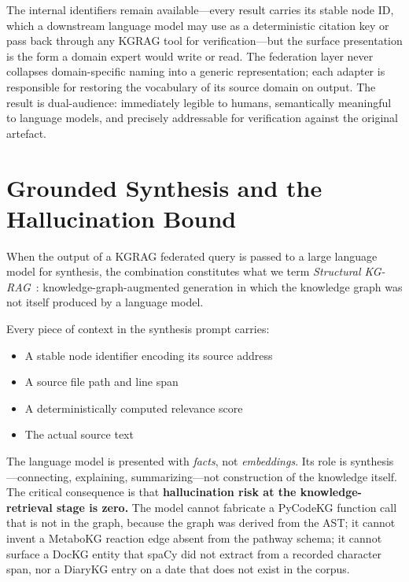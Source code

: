 \documentclass[10pt]{article}
\begin{document}
The internal identifiers remain available---every result carries its stable
node ID, which a downstream language model may use as a deterministic
citation key or pass back through any KGRAG tool for verification---but the
surface presentation is the form a domain expert would write or read. The
federation layer never collapses domain-specific naming into a generic
representation; each adapter is responsible for restoring the vocabulary of
its source domain on output. The result is dual-audience: immediately legible
to humans, semantically meaningful to language models, and precisely
addressable for verification against the original artefact.

\section{Grounded Synthesis and the Hallucination Bound}

When the output of a KGRAG federated query is passed to a large language model
for synthesis, the combination constitutes what we term \emph{Structural
KG-RAG}~\cite{suchanek2025codekg}: knowledge-graph-augmented generation in which
the knowledge graph was not itself produced by a language model.

Every piece of context in the synthesis prompt carries:
\begin{itemize}
  \item A stable node identifier encoding its source address
  \item A source file path and line span
  \item A deterministically computed relevance score
  \item The actual source text
\end{itemize}

The language model is presented with \emph{facts}, not \emph{embeddings}. Its
role is synthesis---connecting, explaining, summarizing---not construction of
the knowledge itself. The critical consequence is that \textbf{hallucination
risk at the knowledge-retrieval stage is zero.} The model cannot fabricate a
PyCodeKG function call that is not in the graph, because the graph was derived
from the AST; it cannot invent a MetaboKG reaction edge absent from the
pathway schema; it cannot surface a DocKG entity that spaCy did not extract
from a recorded character span, nor a DiaryKG entry on a date that does not
exist in the corpus.
\end{document}
